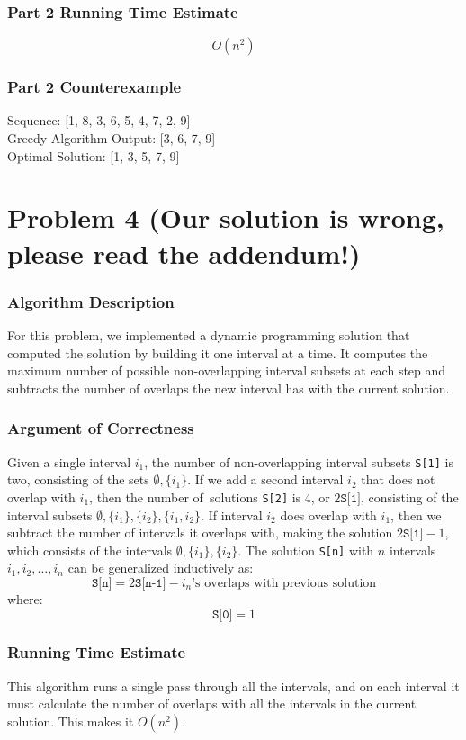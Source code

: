 \documentclass{math}
\begin{document}
\subsubsection*{Part 2 Running Time Estimate}
\[ O(n^2) \]

\subsubsection*{Part 2 Counterexample}
Sequence: [1, 8, 3, 6, 5, 4, 7, 2, 9] \\
Greedy Algorithm Output: [3, 6, 7, 9] \\
Optimal Solution: [1, 3, 5, 7, 9]

\section*{Problem 4 (Our solution is wrong, please read the addendum!)}

\subsubsection*{Algorithm Description}
For this problem, we implemented a dynamic programming solution that computed
the solution by building it one interval at a time. It computes the maximum
number of possible non-overlapping interval subsets at each step and subtracts
the number of overlaps the new interval has with the current solution.

\subsubsection*{Argument of Correctness}
Given a single interval \( i_1 \), the number of non-overlapping interval
subsets \texttt{S[1]} is two, consisting of the sets \( \emptyset,\{i_1\} \).
If we add a second interval \( i_2 \) that does not overlap with \( i_1 \),
then the number of\ solutions \texttt{S[2]} is 4, or \( 2\texttt{S[1]} \),
consisting of the interval subsets \( \emptyset,\{i_1\},\{i_2\},\{i_1,i_2\} \).
If interval \( i_2 \) does overlap with \( i_1 \), then we subtract the number
of intervals it overlaps with, making the solution \( 2\texttt{S[1]}-1 \), which
consists of the intervals \( \emptyset,\{i_1\},\{i_2\} \). The solution
\texttt{S[n]} with \( n \) intervals \( i_1,i_2,\dots,i_n \) can be
generalized inductively as:
\[ \texttt{S[n]} =
  2\texttt{S[n-1]}-i_n\text{'s overlaps with previous solution} \]
where:
\[ \texttt{S[0]} = 1 \]

\subsubsection*{Running Time Estimate}
This algorithm runs a single pass through all the intervals, and on each
interval it must calculate the number of overlaps with all the intervals in
the current solution. This makes it \( O(n^2) \).
\end{document}
